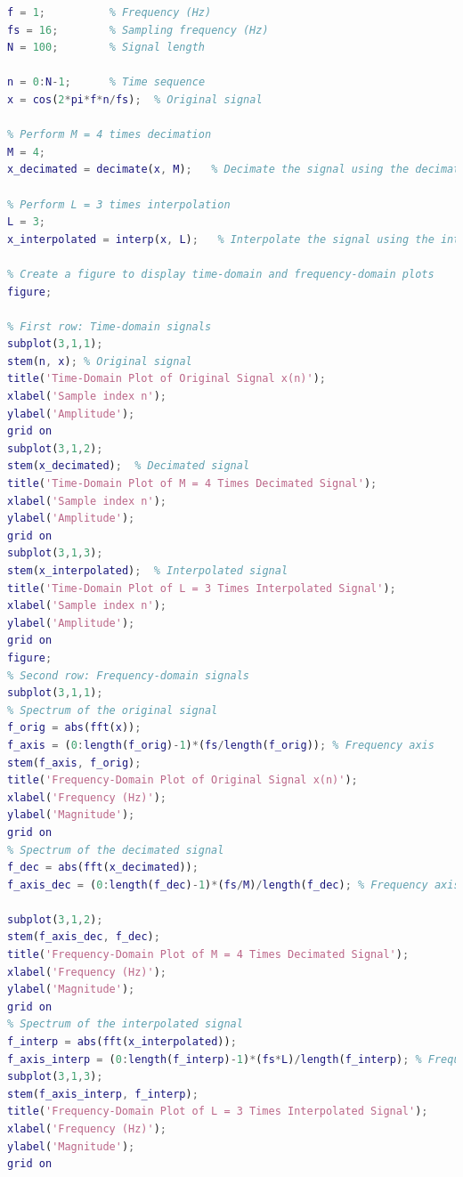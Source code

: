 \begin{example}[令$x(n) =\cos(2\pi fn/f_s)$，其中$f/f_s$ = 1/16，即每个周期内有16个点。试利用MATLAB编程实现：作M = 4倍的抽取，使每个周期变成4点。作L = 3倍的插值，使每个周期变成48点。
  ]
  \begin{lstlisting}[language=matlab]
f = 1;          % Frequency (Hz)
fs = 16;        % Sampling frequency (Hz)
N = 100;        % Signal length

n = 0:N-1;      % Time sequence
x = cos(2*pi*f*n/fs);  % Original signal

% Perform M = 4 times decimation
M = 4;
x_decimated = decimate(x, M);   % Decimate the signal using the decimate function

% Perform L = 3 times interpolation
L = 3;
x_interpolated = interp(x, L);   % Interpolate the signal using the interp function

% Create a figure to display time-domain and frequency-domain plots
figure;

% First row: Time-domain signals
subplot(3,1,1);
stem(n, x); % Original signal
title('Time-Domain Plot of Original Signal x(n)');
xlabel('Sample index n');
ylabel('Amplitude');
grid on
subplot(3,1,2);
stem(x_decimated);  % Decimated signal
title('Time-Domain Plot of M = 4 Times Decimated Signal');
xlabel('Sample index n');
ylabel('Amplitude');
grid on
subplot(3,1,3);
stem(x_interpolated);  % Interpolated signal
title('Time-Domain Plot of L = 3 Times Interpolated Signal');
xlabel('Sample index n');
ylabel('Amplitude');
grid on
figure;
% Second row: Frequency-domain signals
subplot(3,1,1);
% Spectrum of the original signal
f_orig = abs(fft(x));
f_axis = (0:length(f_orig)-1)*(fs/length(f_orig)); % Frequency axis
stem(f_axis, f_orig);
title('Frequency-Domain Plot of Original Signal x(n)');
xlabel('Frequency (Hz)');
ylabel('Magnitude');
grid on
% Spectrum of the decimated signal
f_dec = abs(fft(x_decimated));
f_axis_dec = (0:length(f_dec)-1)*(fs/M)/length(f_dec); % Frequency axis after decimation

subplot(3,1,2);
stem(f_axis_dec, f_dec);
title('Frequency-Domain Plot of M = 4 Times Decimated Signal');
xlabel('Frequency (Hz)');
ylabel('Magnitude');
grid on
% Spectrum of the interpolated signal
f_interp = abs(fft(x_interpolated));
f_axis_interp = (0:length(f_interp)-1)*(fs*L)/length(f_interp); % Frequency axis after interpolation
subplot(3,1,3);
stem(f_axis_interp, f_interp);
title('Frequency-Domain Plot of L = 3 Times Interpolated Signal');
xlabel('Frequency (Hz)');
ylabel('Magnitude');
grid on
  \end{lstlisting}
\end{example}
